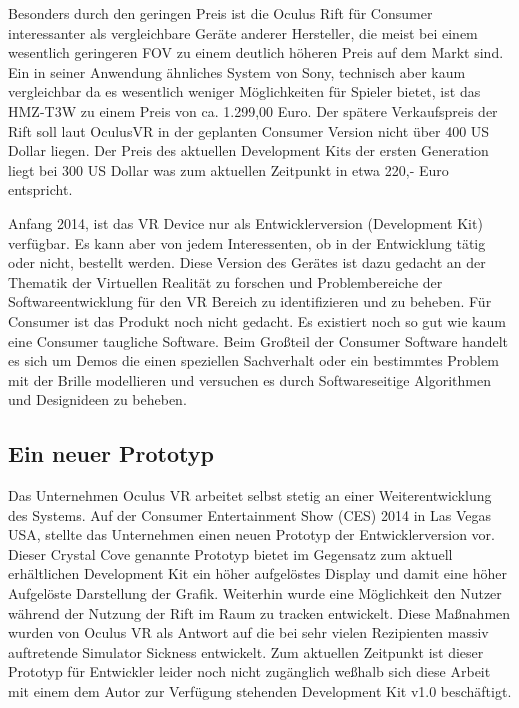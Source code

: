 \documentclass[pagesize, paper=a4, fontsize=12pt,titlepage=true, headings=small, headnosepline, abstractoff, liststotoc, nochapterprefix, plainheadsepline, twoside]{scrreprt}
\begin{document}
Besonders durch den geringen Preis ist die Oculus Rift für Consumer interessanter als vergleichbare Geräte anderer Hersteller, die meist bei einem wesentlich geringeren FOV zu einem deutlich höheren Preis auf dem Markt sind. Ein in seiner Anwendung ähnliches System von Sony, technisch aber kaum vergleichbar da es wesentlich weniger Möglichkeiten für Spieler bietet, ist das HMZ-T3W zu einem Preis von ca. 1.299,00 Euro. Der spätere Verkaufspreis der Rift soll laut OculusVR in der geplanten Consumer Version nicht über 400 US Dollar liegen. Der Preis des aktuellen Development Kits der ersten Generation liegt bei 300 US Dollar was zum aktuellen Zeitpunkt in etwa 220,- Euro entspricht.

Anfang 2014, ist das VR Device nur als Entwicklerversion (Development Kit) verfügbar. Es kann aber von jedem Interessenten, ob in der Entwicklung tätig oder nicht, bestellt werden. Diese Version des Gerätes ist dazu gedacht an der Thematik der Virtuellen Realität zu forschen und Problembereiche der Softwareentwicklung für den VR Bereich zu identifizieren und zu beheben. Für Consumer ist das Produkt noch nicht gedacht. Es existiert noch so gut wie kaum eine Consumer taugliche Software. Beim Großteil der Consumer Software handelt es sich um Demos die einen speziellen Sachverhalt oder ein bestimmtes Problem mit der Brille modellieren und versuchen es durch Softwareseitige Algorithmen und Designideen zu beheben.

\subsection{Ein neuer Prototyp}
Das Unternehmen Oculus VR arbeitet selbst stetig an einer Weiterentwicklung des Systems. Auf der Consumer Entertainment Show (CES) 2014 in Las Vegas USA, stellte das Unternehmen einen neuen Prototyp der Entwicklerversion vor. Dieser Crystal Cove genannte Prototyp bietet im Gegensatz zum aktuell erhältlichen Development Kit ein höher aufgelöstes Display und damit eine höher Aufgelöste Darstellung der Grafik. Weiterhin wurde eine Möglichkeit den Nutzer während der Nutzung der Rift im Raum zu tracken entwickelt. Diese Maßnahmen wurden von Oculus VR als Antwort auf die bei sehr vielen Rezipienten massiv auftretende Simulator Sickness entwickelt. Zum aktuellen Zeitpunkt ist dieser Prototyp für Entwickler leider noch nicht zugänglich weßhalb sich diese Arbeit mit einem dem Autor zur Verfügung stehenden Development Kit v1.0 beschäftigt.
\end{document}

